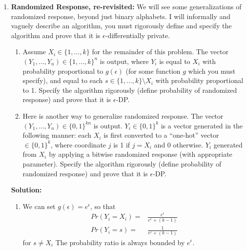 \documentclass[12pt]{article}
\begin{document}
\begin{enumerate}

\item \textbf{Randomized Response, re-revisited:}
We will see some generalizations of randomized response, beyond just binary alphabets.
I will informally and vaguely describe an algorithm, you must rigorously define and specify the algorithm and prove that it is $\epsilon$-differentially
private.
\begin{enumerate}
\item Assume $X_i \in \{1, \dots, k\}$ for the remainder of this problem.
The vector $(Y_1, \dots , Y_n)\in \{1, \dots, k\}^n$ is output, where $Y_i$ is equal to $X_i$ with probability proportional to $g(\epsilon)$ 
(for some function $g$ which you must specify), and equal to each $s \in \{1, . . . , k\} \setminus X_i$ with probability proportional to 1.
Specify the algorithm rigorously (define probability of randomized response) and prove that it is $\epsilon$-DP.

\item Here is another way to generalize randomized response. 
The vector $(Y_1, \dots , Y_n) \in \{0, 1\}^{kn}$ is output. $Y_i \in \{0, 1\}^k$ is a vector generated in the following manner:
each $X_i$ is first converted to a ``one-hot'' vector $\in \{0, 1\}^k$, where coordinate $j$ is 1 if $j = X_i$ and 0 otherwise.
$Y_i$ generated from $X_i$ by applying a bitwise randomized response (with appropriate parameter).
Specify the algorithm rigorously (define probability of randomized response) and prove that it is $\epsilon$-DP.
\end{enumerate}

\begin{solution}
{\bf Solution: }\\
\begin{enumerate}
    \item We can set $g(\epsilon) = e^{\epsilon}$, so that
    \begin{align*}
        Pr(Y_i=X_i) =& \frac{e^\epsilon}{e^\epsilon +(k-1)}\\
        Pr(Y_i=s) =& \frac{1}{e^\epsilon +(k-1)}
    \end{align*}
    for $s\neq X_i$
    The probability ratio is always bounded by $e^{\epsilon}$.


\end{enumerate}
\end{solution}
\end{enumerate}
\end{document}
